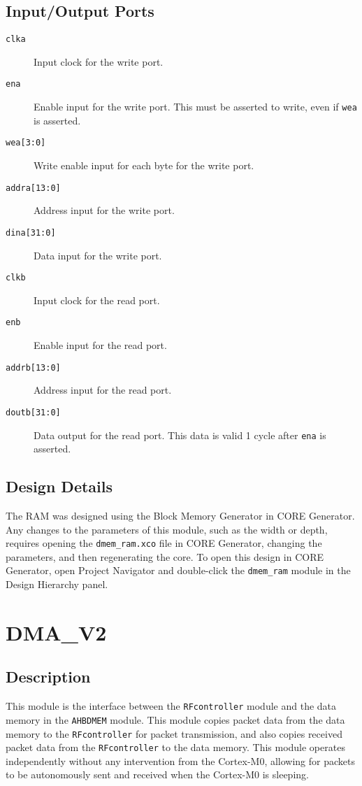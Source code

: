 \subsection{Input/Output Ports}
\begin{description}
	\item[\texttt{clka}] Input clock for the write port.
	\item[\texttt{ena}] Enable input for the write port. This must be asserted to write, even if \texttt{wea} is asserted.
	\item[\texttt{wea[3:0]}] Write enable input for each byte for the write port.
	\item[\texttt{addra[13:0]}] Address input for the write port.
	\item[\texttt{dina[31:0]}] Data input for the write port.
	\item[\texttt{clkb}] Input clock for the read port.
	\item[\texttt{enb}] Enable input for the read port.
	\item[\texttt{addrb[13:0]}] Address input for the read port.
	\item[\texttt{doutb[31:0]}] Data output for the read port. This data is valid 1 cycle after \texttt{ena} is asserted.
\end{description}

\subsection{Design Details}
The RAM was designed using the Block Memory Generator in CORE Generator. Any changes to the parameters of this module, such as the width or depth, requires opening the \texttt{dmem\_ram.xco} file in CORE Generator, changing the parameters, and then regenerating the core. To open this design in CORE Generator, open Project Navigator and double-click the \texttt{dmem\_ram} module in the Design Hierarchy panel.

\section{DMA\_V2} \label{dma}
\subsection{Description}
This module is the interface between the \texttt{RFcontroller} module and the data memory in the \texttt{AHBDMEM} module. This module copies packet data from the data memory to the \texttt{RFcontroller} for packet transmission, and also copies received packet data from the \texttt{RFcontroller} to the data memory. This module operates independently without any intervention from the Cortex-M0, allowing for packets to be autonomously sent and received when the Cortex-M0 is sleeping.

